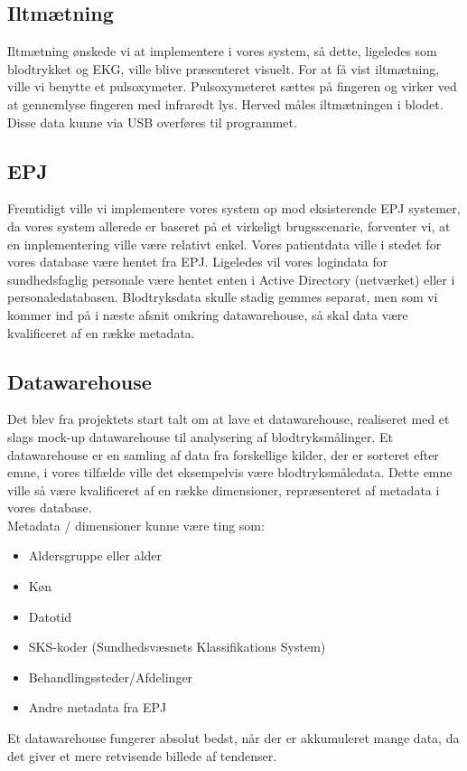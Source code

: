 \subsection{Iltmætning}
Iltmætning ønskede vi at implementere i vores system, så dette, ligeledes som blodtrykket og EKG, ville blive præsenteret visuelt. For at få vist iltmætning, ville vi benytte et pulsoxymeter. Pulsoxymeteret sættes på fingeren og virker ved at gennemlyse fingeren med infrarødt lys. Herved måles iltmætningen i blodet. Disse data kunne via USB overføres til programmet. 
\subsection{EPJ}
Fremtidigt ville vi implementere vores system op mod eksisterende EPJ systemer, da vores system allerede er baseret på et virkeligt brugsscenarie, forventer vi, at en implementering ville være relativt enkel. Vores patientdata ville i stedet for vores database være hentet fra EPJ. Ligeledes vil vores logindata for sundhedsfaglig personale være hentet enten i Active Directory (netværket) eller i personaledatabasen. Blodtryksdata skulle stadig gemmes separat, men som vi kommer ind på i næste afsnit omkring datawarehouse, så skal data være kvalificeret af en række metadata.
\subsection{Datawarehouse}
Det blev fra projektets start talt om at lave et datawarehouse, realiseret med et slags mock-up datawarehouse til analysering af blodtryksmålinger. Et datawarehouse er en samling af data fra forskellige kilder, der er sorteret efter emne, i vores tilfælde ville det eksempelvis være blodtryksmåledata. Dette emne ville så være kvalificeret af en række dimensioner, repræsenteret af metadata i vores database.\\ 
Metadata / dimensioner kunne være ting som:
\begin{itemize}
\item Aldersgruppe eller alder
\item Køn
\item Datotid
\item SKS-koder (Sundhedsvæsnets Klassifikations System)
\item Behandlingssteder/Afdelinger
\item Andre metadata fra EPJ
\end{itemize}
Et datawarehouse fungerer absolut bedst, når der er akkumuleret mange data, da det giver et mere retvisende billede af tendenser. 
